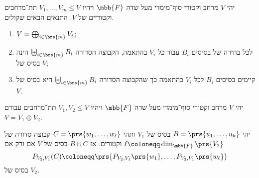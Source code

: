 \documentclass[a4paper,10pt,twoside,openany]{article}
\begin{document}
\begin{proposition} \label{proposition:direct-sums}
יהי
$V$
מרחב וקטורי סוף־מימדי מעל שדה
$\mbb{F}$
ויהיו
$V_1, \ldots, V_m \leq V$
תת־מרחבים וקטוריים של $V$.
התנאים הבאים שקולים.

\begin{enumerate}
\item $V = \bigoplus_{i \in \brs{m}} V_i$;
\item לכל בחירה של בסיסים $B_i$ עבור כל $V_i$ בהתאמה, הקבוצה הסדורה
$\biguplus_{i \in \brs{m}} B_i$
הינה בסיס של
$V$;
\item
קיימים בסיסים
$B_i$
לכל
$V_i$
בהתאמה כך שהקבוצה הסדורה
$\biguplus_{i \in \brs{m}} B_i$
היא בסיס של
$V$.
\end{enumerate}
\end{proposition}

\begin{lemma} \label{lemma:basis-projection}
יהי
$V$
מרחב וקטורי סוף־מימדי מעל שדה
$\mbb{F}$
ויהיו
$V_1, V_2 \leq V$
תת־מרחבים עבורם
$V = V_1 \oplus V_2$.

יהי
$B = \prs{u_1, \ldots, u_k}$
בסיס של
$V_1$
ותהי
$C = \prs{w_1, \ldots, w_\ell}$
קבוצה סדורה של
$\ell \coloneqq \dim_{\mbb{F}}\prs{V_2}$
וקטורים.
אז
$B \uplus C$
בסיס של
$V$
אם ורק אם
\[P_{V_2, V_1}(C) \coloneqq \prs{P_{V_2, V_1}{\prs{w_1}}, \ldots, P_{V_2, V_1}\prs{w_\ell}}\]
בסיס של
$V_2$.
\end{lemma}
\end{document}
